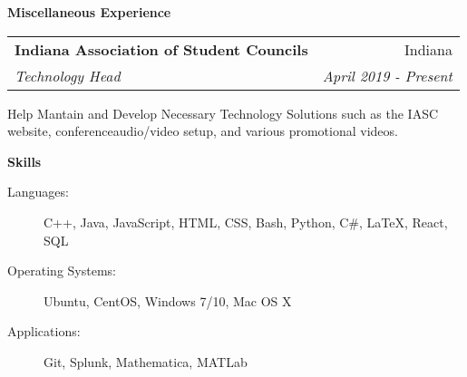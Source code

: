 \documentclass[letterpaper,11pt]{article}
\makeatletter
\newcommand{\resheading}[1]{ \begin{trixiematel}\textbf{#1}\end{trixiematel}}
\newcommand{\ressubheading}[4]{
\begin{tabular*}{6.5in}{l@{\extracolsep{\fill}}r}
                \textbf{#1} & #2 \\
                \textit{#3} & \textit{#4} \\
\end{tabular*}\vspace{2pt}}
\makeatother
\begin{document}
\resheading{Miscellaneous Experience}
\begin{description}
\item
\ressubheading{Indiana Association of Student Councils}{Indiana}{Technology Head}{April 2019 - Present} 


Help Mantain and Develop Necessary Technology Solutions such as the IASC website, conferenceaudio/video setup, and various promotional videos.


 \end{description}

\resheading{Skills}

\begin{description}
\item[Languages:]
C++, Java, JavaScript, HTML, CSS, Bash, Python, C\#, \LaTeX, React, SQL

\item[Operating Systems:]
Ubuntu, CentOS, Windows 7/10, Mac OS X

\item[Applications:]
Git, Splunk, Mathematica, MATLab
\end{description}
\end{document}
